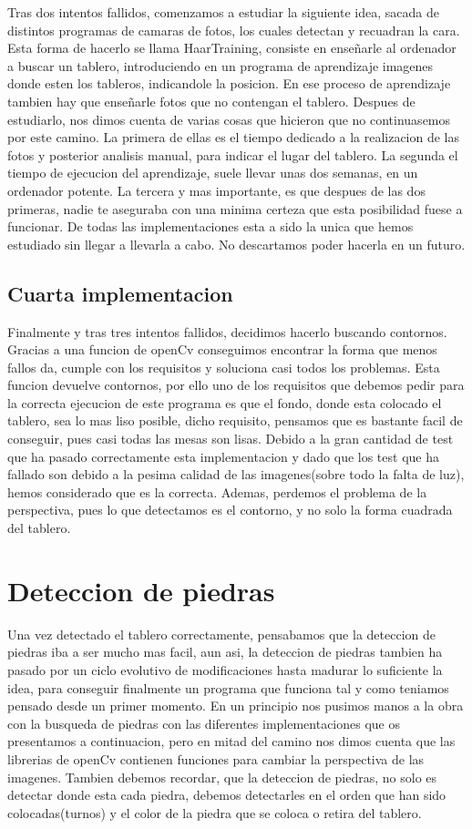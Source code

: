 \documentclass[12pt,a4paper]{report}
\begin{document}
Tras dos intentos fallidos, comenzamos a estudiar la siguiente idea, sacada de distintos programas de camaras de fotos, los cuales detectan y recuadran la cara. 
Esta forma de hacerlo se llama HaarTraining, consiste en enseñarle al ordenador a buscar un tablero, introduciendo en un programa de aprendizaje imagenes donde esten los tableros, indicandole la posicion. En ese proceso de aprendizaje tambien hay que enseñarle fotos que no contengan el tablero.
Despues de estudiarlo, nos dimos cuenta de varias cosas que hicieron que no continuasemos por este camino.
La primera de ellas es el tiempo dedicado a la realizacion de las fotos y posterior analisis manual, para indicar el lugar del tablero.
La segunda el tiempo de ejecucion del aprendizaje, suele llevar unas dos semanas, en un ordenador potente.
La tercera y mas importante, es que despues de las dos primeras, nadie te aseguraba con una minima certeza que esta posibilidad fuese a funcionar.
De todas las implementaciones esta a sido la unica que hemos estudiado sin llegar a llevarla a cabo. No descartamos poder hacerla en un futuro.

\subsection{Cuarta implementacion}

Finalmente y tras tres intentos fallidos, decidimos hacerlo buscando contornos. Gracias a una funcion de openCv conseguimos encontrar la forma que menos fallos da, cumple con los requisitos y soluciona casi todos los problemas.
Esta funcion devuelve contornos, por ello uno de los requisitos que debemos pedir para la correcta ejecucion de este programa es que el fondo, donde esta colocado el tablero, sea lo mas liso posible, dicho requisito, pensamos que es bastante facil de conseguir, pues casi todas las mesas son lisas.
Debido a la gran cantidad de test que ha pasado correctamente esta implementacion y dado que los test que ha fallado son debido a la pesima calidad de las imagenes(sobre todo la falta de luz), hemos considerado que es la correcta. Ademas, perdemos el problema de la perspectiva, pues lo que detectamos es el contorno, y no solo la forma cuadrada del tablero.

\section{Deteccion de piedras}
Una vez detectado el tablero correctamente, pensabamos que la deteccion de piedras iba a ser mucho mas facil, aun asi, la deteccion de piedras tambien ha pasado por un ciclo evolutivo de modificaciones hasta madurar lo suficiente la idea, para conseguir finalmente un programa que funciona tal y como teniamos pensado desde un primer momento.
En un principio nos pusimos manos a la obra con la busqueda de piedras con las diferentes implementaciones que os presentamos a continuacion, pero en mitad del camino nos dimos cuenta que las librerias de openCv contienen funciones para cambiar la perspectiva de las imagenes.
Tambien debemos recordar, que la deteccion de piedras, no solo es detectar donde esta cada piedra, debemos detectarles en el orden que han sido colocadas(turnos) y el color de la piedra que se coloca o retira del tablero.
\end{document}
